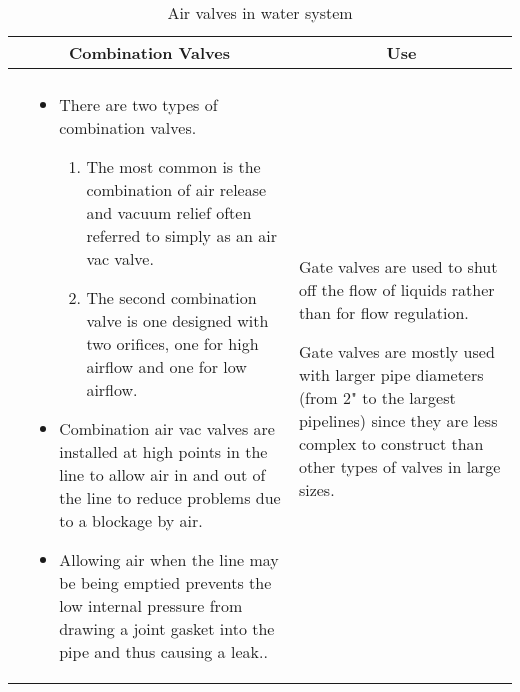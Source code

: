 \begin{landscape}
\begin{table}[h!]
\begin{tabular}{| m{7cm} m{10cm} | m{7cm} | }
    \\ \hline
\multicolumn{2}{c}{\scriptsize{Combination Valves}} & \multicolumn{1}{c}{\scriptsize{Use}}\\ \hline
    \begin{minipage}{.3\textwidth}
   \vspace{-2em} 
     \texttt{[image: GateValve2.png]}\\
    \end{minipage}
    &
\phantom{\tiny{Phantom}}   \vspace{-1em}
  \scriptsize{\begin{itemize}\setlength\itemsep{1em}
  \item There are two types of combination valves. \begin{enumerate} \item The most common is the combination of air release and vacuum relief often referred to simply as an air vac valve. \item The second combination valve is one designed with two orifices, one for high airflow and one for low airflow.\end{enumerate} \item Combination air vac valves are installed at high points in the line to allow air in and out of the line to reduce problems due to a blockage by air. \item Allowing air when the line may be being emptied prevents the low internal pressure from drawing a joint gasket into the pipe and thus causing a leak..
  \end{itemize}}  
    &
        \vspace{0.4cm}
      \begin{itemize}[leftmargin=*]
      \scriptsize{
        \item Gate valves are used to shut off the flow of liquids rather than for flow regulation. \item Gate valves are mostly used with larger pipe diameters (from 2" to the largest pipelines) since they are less complex to construct than other types of valves in large sizes. }
      \end{itemize}
  
    \\ \hline
   \end{tabular}
     \caption{Air valves in water system}
                \label{table:Airvalve} 
\end{table}

\end{landscape}



